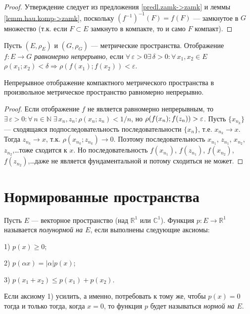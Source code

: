 \documentclass[10pt]{article}
\newcommand*{\p}[1]{#1\nobreak\discretionary{}{\hbox{$\mathsurround=0pt #1$}}{}}
\begin{document}
\begin{proof}
Утверждение следует из предложения \ref{predl.zamk->zamk} и леммы
\ref{lemm.hau.komp->zamk}, поскольку $(f^{-1})^{-1}(F)=f(F)$ ---
замкнутое в $G$ множество (т.к. если $F\subset E$ замкнуто в
компакте, то и само $F$ компакт).
\end{proof}

\begin{df}
Пусть $(E,\rho_E)$ и $(G,\rho_G)$ --- метрические пространства.
Отображение $f\colon E\to G$ \emph{равномерно непрерывно}, если
$\forall\,\varepsilon>0$\;\;$\exists\,\delta>0:\forall\, x_1,x_2\in
E$\;\;$\rho(x_1;x_2)<\delta\Rightarrow\rho(f(x_1);f(x_2))<\varepsilon$.
\end{df}

\begin{prop}
Непрерывное отображение компактного метрического пространства в
произвольное метрическое пространство равномерно непрерывно.
\end{prop}

\begin{proof}
Если отображение $f$ не является равномерно непрерывным, то
$\exists\,\varepsilon>0:\forall\,n\in\mathbb{N}\;\exists\,x_n, z_n:
\rho(x_n;z_n)<1/n$, но $\rho(f(x_n);f(z_n))\p>\varepsilon$. Пусть
$\{x_{n_k}\}$ --- сходящаяся подпоследовательность
последовательности $\{x_n\}$, т.е. $x_{n_k}\to x$. Тогда $z_{n_k}\to
x$, т.к. $\rho(x_{n_k};z_{n_k})\to 0$. Поэтому последовательность
$x_{n_1}$, $z_{n_1}$, $x_{n_2}$, $z_{n_2}$,\ldots тоже сходится к
$x$. Но последовательность $f(x_{n_1})$, $f(z_{n_1})$, $f(x_{n_2})$,
$f(z_{n_2})$,\ldots даже не является фундаментальной и потому
сходиться не может.
\end{proof}


\section{Нормированные пространства}

\begin{df}
Пусть $E$ --- векторное пространство (над $\mathbb{R}^1$ или
$\mathbb{C}^1$). Функция $p\colon E\to\mathbb{R}^1$ называется
\emph{полунормой на $E$}, если выполнены следующие аксиомы:

1) $p(x)\geqslant0$;

2) $p(\alpha x)=|\alpha|p(x)$;

3) $p(x_1+x_2)\leqslant p(x_1)+p(x_2)$.

Если аксиому 1) усилить, а именно, потребовать к тому же, чтобы
$p(x)=0$ тогда и только тогда, когда $x=0$, то функция $p$ будет
называться \emph{нормой на $E$}.
\end{df}
\end{document}
